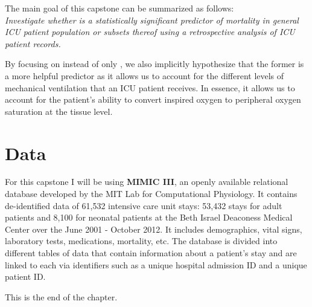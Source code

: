The main goal of this capstone can be summarized as follows: \\
\textit{ Investigate whether \SF is a statistically significant predictor of mortality in general ICU patient population or subsets thereof using a retrospective analysis of ICU patient records.
}

By focusing on \SF instead of only \Sp, we also implicitly hypothesize that the former is a more helpful predictor as it allows us to account for the different levels of mechanical ventilation that an ICU patient receives. In essence, it allows us to account for the patient's ability to convert inspired oxygen to peripheral oxygen saturation at the tissue level. 


\section{Data}

For this capstone I will be using \textbf{MIMIC III}, an openly available relational database developed by the MIT Lab for Computational Physiology. It contains de-identified data of 61,532 intensive care unit stays: 53,432 stays for adult patients and 8,100 for neonatal patients at the Beth Israel Deaconess Medical Center over the June 2001 - October 2012. It includes demographics, vital signs, laboratory tests, medications, mortality, etc. The database is divided into different tables of data that contain information about a patient's stay and are linked to each via identifiers such as a unique hospital admission ID and a unique patient ID. 



This is the end of the chapter. 

